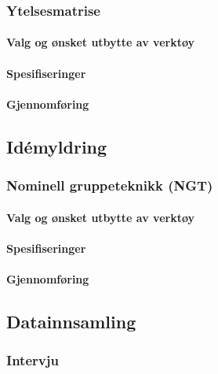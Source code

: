 \subsubsection{Ytelsesmatrise}

\paragraph{Valg og ønsket utbytte av verktøy}


\paragraph{Spesifiseringer}


\paragraph{Gjennomføring}



\subsection{Idémyldring}

\subsubsection{Nominell gruppeteknikk (NGT)}

\paragraph{Valg og ønsket utbytte av verktøy}


\paragraph{Spesifiseringer}


\paragraph{Gjennomføring}



\subsection{Datainnsamling}

\subsubsection{Intervju}

